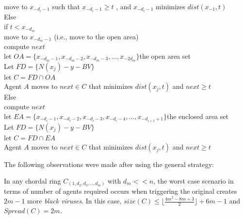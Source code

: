 \begin{center}
{\begin{minipage}{7.5 cm}
\begin{tabbing}
\tab\tab move to $ x_{-d_{i}-1} $ such that  $x_{-d_{i}-1} \ge t$ , and $x_{-d_{i}-1} $ minimizes $dist(x_{-1},t)$  \\ %

\tab Else\\
\tab\tab if  $t < x_{-d_m}$\\
\tab\tab\tab move to $x_{-d_m-1}$  (i.e., move to the open area)  \\
\tab\tab\tab compute $next$\\
\tab\tab\tab\tab let $OA=\{x_{-d_{m}-1}, x_{-d_{m}-2},x_{-d_{m}-3},...,x_{-2d_{m}}\}$the open area set \\
\tab\tab\tab\tab  Let $FD =\{ N(x_j)- y- BV \}$ \\%
\tab\tab\tab\tab let $C=FD  \cap OA$ \\
\tab\tab \tab\tab Agent $A$ moves to $next \in C$ that minimizes $dist(x_j,t)$ and $next \ge t$\\


\tab\tab Else\\

\tab\tab\tab compute $next$\\
\tab\tab\tab\tab let $EA=\{x_{-d_i-1},x_{-d_i-2}, x_{-d_i-3},x_{-d_i-4},...,x_{-d_{i+1}+1}\}$the enclosed area set\\
\tab\tab\tab\tab  Let $FD =\{ N(x_j)- y - BV \}$ \\%
\tab\tab\tab\tab let $C=FD  \cap EA$ \\
\tab\tab \tab\tab Agent $A$ moves to $next \in C$ that minimizes $dist(x_j,t)$ and $next \ge t$\\

   

\end{tabbing}
\end{minipage}
}
\end{center}


\noindent  The following observations were made after using the general strategy:

\begin{theorem}
In any chordal ring $C_(1,d_2,d_3,....d_m)$ with $d_m<<n$, the worst case scenario in terms of number of agents required occurs when triggering the original \bv creates $2m-1$ more {\it black viruses}. In this case,  $size(C)\leq  \lfloor \frac {4m^2-8m+3}{2} \rfloor +6m-1$ and $Spread(C)=2m$.
\end{theorem}

